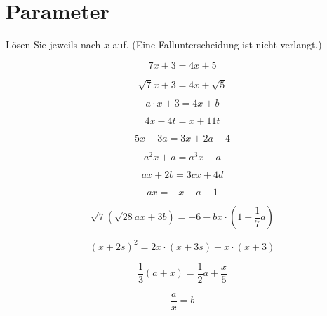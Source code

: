 \section{Parameter}
Lösen Sie jeweils nach $x$ auf. (Eine Fallunterscheidung ist nicht verlangt.)
\begin{bbwAufgabenBlock}

\item $$7x + 3 = 4x + 5$$

\item $$\sqrt{7}x + 3 = 4x + \sqrt{5}$$

\item $$a\cdot{}x + 3 = 4x + b$$

\item $$4x-4t = x+11t$$

\item $$5x-3a = 3x+2a-4$$

\item $$a^2x+a = a^3x -a$$

\item $$ax + 2b = 3cx +4d$$

\item $$ax = -x-a-1$$

\item $$\sqrt{7}\left(\sqrt{28}ax+3b\right) = -6-bx\cdot{}\left(1-\frac17a\right)$$

\item $$(x+2s)^2 = 2x\cdot{}(x+3s)-x\cdot{}(x+3)$$

\item $$\frac13(a+x) = \frac12 a + \frac{x}5$$

\item $$\frac{a}{x} = b$$

\end{bbwAufgabenBlock}
\newpage

